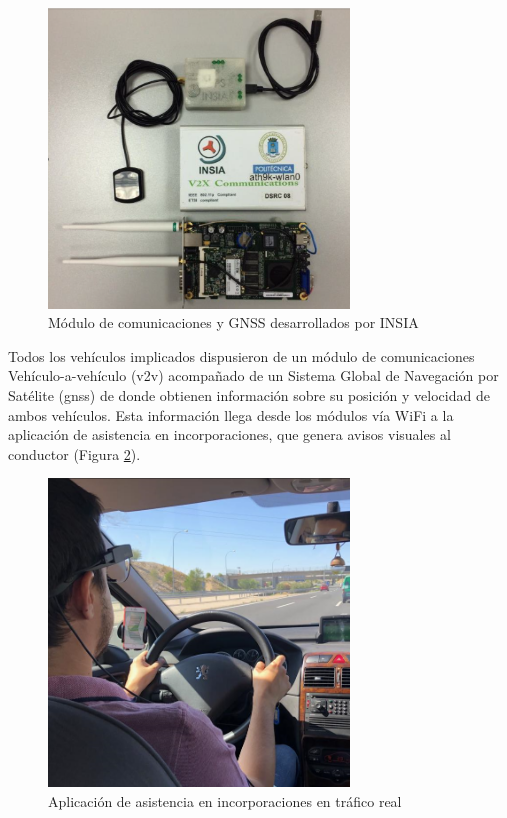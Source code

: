 \begin{figure}[h]
    \centering
    \includegraphics[width=8cm]
    {figures/3.13.png}
    \caption{ \label{fig:3.13} Módulo de comunicaciones y GNSS desarrollados por INSIA}
\end{figure}

Todos los vehículos implicados dispusieron de un módulo de comunicaciones Vehículo-a-vehículo (\gls{v2v}) acompañado de un Sistema Global de Navegación por Satélite (\gls{gnss}) de donde obtienen información sobre su posición y velocidad de ambos vehículos. Esta información llega desde los módulos vía WiFi a la aplicación de asistencia en incorporaciones, que genera avisos visuales al conductor (Figura \ref{fig:3.14}).

\newpage
\begin{figure}[h]
    \centering
    \includegraphics[width=8cm]
    {figures/3.14.png}
    \caption{ \label{fig:3.14} Aplicación de asistencia en incorporaciones en tráfico real}
\end{figure}

